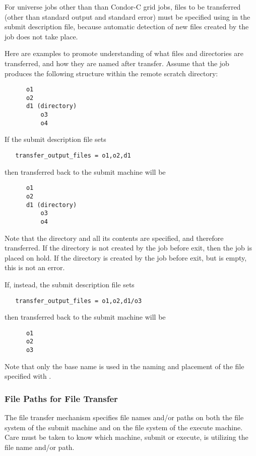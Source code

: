For  universe jobs other than than Condor-C grid jobs,
files to be transferred 
(other than standard output and standard error)
must be specified using 
in the submit description file, because automatic detection of new files
created by the job does not take place.

Here are examples to promote understanding of what files and
directories are transferred, and how they are named after transfer.
Assume that the job produces the following structure within the
remote scratch directory:
\begin{verbatim}
      o1
      o2
      d1 (directory)
          o3
          o4 
\end{verbatim}

If the submit description file sets
\begin{verbatim}
   transfer_output_files = o1,o2,d1
\end{verbatim}
then transferred back to the submit machine will be
\begin{verbatim}
      o1
      o2
      d1 (directory)
          o3
          o4 
\end{verbatim}
Note that the directory  and all its contents are specified,
and therefore transferred.  
If the directory  is not created by the job before exit,
then the job is placed on hold. 
If the directory  is created by the job before exit,
but is empty, this is not an error.

If, instead, the submit description file sets
\begin{verbatim}
   transfer_output_files = o1,o2,d1/o3
\end{verbatim}
then transferred back to the submit machine will be
\begin{verbatim}
      o1
      o2
      o3
\end{verbatim}
Note that only the base name is used in the naming and placement
of the file specified with .


\subsubsection{File Paths for File Transfer}



The file transfer mechanism specifies file names and/or paths on
both the file system of the submit machine and on the
file system of the execute machine.
Care must be taken to know which machine, submit or execute,
is utilizing the file name and/or path. 

